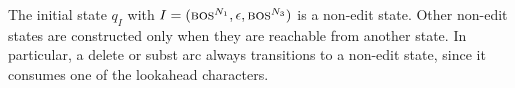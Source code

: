 \documentclass[11pt,letterpaper]{article}
\newcommand{\Sigmax}{\Sigma_{\text x}}
\newcommand{\Sigmay}{\Sigma_{\text y}}
\newcommand{\bos}{\textsc{bos}\xspace}
\newcommand{\eos}{\textsc{eos}\xspace}
\newcommand{\ryan}[1]{\todo[color=green!40,author=Ryan]{#1}}
\newcommand{\adi}[1]{\todo[color=orange!40,author=Adi]{#1}}
\begin{document}
The initial state $q_I$ with $I = (\bos^{N_1},\epsilon,\bos^{N_3})$ is a non-edit state.  Other non-edit states are constructed only when they are reachable from another state.  In particular, a {\sc delete} or {\sc subst} arc always transitions to a non-edit state, since it consumes one of the lookahead characters.

% 
% 
% 
\end{document}
